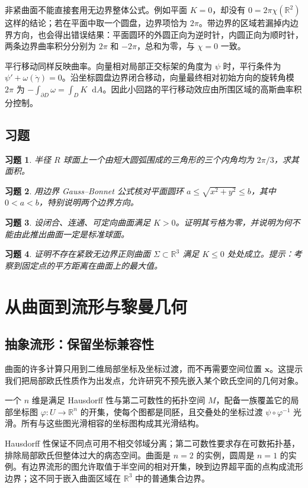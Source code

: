 \documentclass[UTF8,12pt,a4paper,fontset=fandol]{ctexbook}
\newcommand{\R}{\mathbb R}
\newcommand{\dd}{\mathop{}\!\mathrm d}
\newtheorem{exercise}{习题}[chapter]
\begin{document}
非紧曲面不能直接套用无边界整体公式。例如平面 $K=0$，却没有 $0=2\pi\chi(\R^2)$ 这样的结论；若在平面中取一个圆盘，边界项恰为 $2\pi$。带边界的区域若漏掉内边界方向，也会得出错误结果：平面圆环的外圆正向为逆时针，内圆正向为顺时针，两条边界曲率积分分别为 $2\pi$ 和 $-2\pi$，总和为零，与 $\chi=0$ 一致。

平行移动同样反映曲率。向量相对局部正交标架的角度为 $\psi$ 时，平行条件为 $\psi'+\omega(\dot\gamma)=0$。沿坐标圆盘边界闭合移动，向量最终相对初始方向的旋转角模 $2\pi$ 为 $-\int_{\partial D}\omega=\int_DK\dd A$。因此小回路的平行移动效应由所围区域的高斯曲率积分控制。

\section{习题}
\begin{exercise}\label{ex:dg-gb-triangle}
半径 $R$ 球面上一个由短大圆弧围成的三角形的三个内角均为 $2\pi/3$，求其面积。
\end{exercise}
\begin{exercise}\label{ex:dg-gb-annulus}
用边界 Gauss--Bonnet 公式核对平面圆环 $a\le\sqrt{x^2+y^2}\le b$，其中 $0<a<b$，特别说明两个边界方向。
\end{exercise}
\begin{exercise}\label{ex:dg-gb-positive}
设闭合、连通、可定向曲面满足 $K>0$。证明其亏格为零，并说明为何不能由此推出曲面一定是标准球面。
\end{exercise}
\begin{exercise}\label{ex:dg-gb-flat-embedded}
证明不存在紧致无边界正则曲面 $\Sigma\subset\R^3$ 满足 $K\le0$ 处处成立。提示：考察到固定点的平方距离在曲面上的最大值。
\end{exercise}

\chapter{从曲面到流形与黎曼几何}
\label{chap:dg-manifolds}

\section{抽象流形：保留坐标兼容性}
曲面的许多计算只用到二维局部坐标及坐标过渡，而不再需要空间位置 $\mathbf x$。这提示我们把局部欧氏性质作为出发点，允许研究不预先嵌入某个欧氏空间的几何对象。

\begin{definition}[光滑流形]
一个 $n$ 维是满足 Hausdorff 性与第二可数性的拓扑空间 $M$，配备一族覆盖它的局部坐标图 $\varphi:U\to\R^n$ 的开集，使每个图都是同胚，且交叠处的坐标过渡 $\psi\circ\varphi^{-1}$ 光滑。所有与这些图光滑相容的坐标图构成其光滑结构。
\end{definition}
Hausdorff 性保证不同点可用不相交邻域分离；第二可数性要求存在可数拓扑基，排除局部欧氏但整体过大的病态空间。曲面是 $n=2$ 的实例，圆周是 $n=1$ 的实例。有边界流形的图允许取值于半空间的相对开集，映到边界超平面的点构成流形边界；这不同于嵌入曲面区域在 $\R^3$ 中的普通集合边界。
\end{document}
